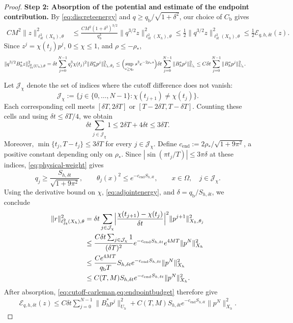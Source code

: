 \documentclass[print,wide,eng]{draft}
\begin{document}
\begin{proof}
\medskip

\textbf{Step 2: Absorption of the potential and estimate of the endpoint contribution.}
By \cref{eq:discreteenergy} and $q\ge q_{\mathrm b}/\sqrt{1+\delta^2}$, our choice of $C_{\mathrm b}$ gives
%
\begin{align*}
CM^2\|z\|_{\ell_{\delta t}^2(X_h),\theta}^2
&\le\frac{CM^2(1+\delta^2)^{3/2}}{q_{\mathrm b}^3}
\|q^{3/2}z\|_{\ell_{\delta t}^2(X_h),\theta}^2 \le\frac12\|q^{3/2}z\|_{\ell_{\delta t}^2(X_h),\theta}^2
\le\frac12\mathcal E_{q,h,\delta t}(z).
\end{align*}
%
Since $z^j=\chi(t_j)p^j$, $0\le\chi\le1$, and $\rho\le-\rho_*$,
%
\begin{align*}
\|q^{3/2}B_h^*z\|_{\ell_{\delta t}^2(U_h),\theta}^2
&=\delta t\sum_{j=0}^{N-1}q_j^3\chi(t_j)^2\|B_h^*p^j\|_{U_h,\theta_j}^2 \le\Bigl(\sup_{s\ge q_c}s^3e^{-2\rho_*s}\Bigr)
\delta t\sum_{j=0}^{N-1}\|B_h^*p^j\|_{U_h}^2 \le C\delta t\sum_{j=0}^{N-1}\|B_h^*p^j\|_{U_h}^2.
\end{align*}
%

Let $\mathcal J_\chi$ denote the set of indices where the cutoff difference does not vanish:
$$
\mathcal J_\chi:=\{j\in\{0,\ldots,N-1\}:\chi(t_{j+1})\ne\chi(t_j)\}.
$$
Each corresponding cell meets $[\delta T,2\delta T]$ or $[T-2\delta T,T-\delta T]$. Counting these cells and using $\delta t\le\delta T/4$, we obtain
$$
\delta t\sum_{j\in\mathcal J_\chi}1\le2\delta T+4\delta t\le3\delta T.
$$
Moreover, $\min\{t_j,T-t_j\}\le3\delta T$ for every $j\in\mathcal J_\chi$.
Define $c_{\mathrm{end}}:=2\rho_*/\sqrt{1+9\pi^2}$, a positive constant depending only on $\rho_*$. Since $|\sin(\pi t_j/T)|\le3\pi\delta$ at these indices, \cref{eq:physical-weight} gives
$$
q_j\ge\frac{S_{h,\delta t}}{\sqrt{1+9\pi^2}},\qquad
\theta_j(x)^2\le e^{-c_{\mathrm{end}}S_{h,\delta t}},
\qquad x\in\Omega,\quad j\in\mathcal J_\chi.
$$
Using the derivative bound on $\chi$, \cref{eq:adjointenergy}, and $\delta=q_{\mathrm b}/S_{h,\delta t}$, we conclude
\begin{align}\label{eq:endpointbudget}
\|r\|_{\ell_{\delta t}^2(X_h),\theta}^2
&=\delta t\sum_{j\in\mathcal J_\chi}
\Bigl|\frac{\chi(t_{j+1})-\chi(t_j)}{\delta t}\Bigr|^2
\|p^{j+1}\|_{X_h,\theta_j}^2\notag\\
&\le\frac{C\delta t\sum_{j\in\mathcal J_\chi}1}{(\delta T)^2}
e^{-c_{\mathrm{end}}S_{h,\delta t}}e^{4MT}\|p^N\|_{X_h}^2\notag\\
&\le\frac{Ce^{4MT}}{q_{\mathrm b}T}S_{h,\delta t}e^{-c_{\mathrm{end}}S_{h,\delta t}}\|p^N\|_{X_h}^2\notag\\
&\le C(T,M)S_{h,\delta t}e^{-c_{\mathrm{end}}S_{h,\delta t}}\|p^N\|_{X_h}^2.
\end{align}
After absorption, \cref{eq:cutoff-carleman,eq:endpointbudget} therefore give
\begin{align}\label{eq:cutoff-energy}
\mathcal E_{q,h,\delta t}(z)
\le C\delta t\sum_{j=0}^{N-1}\|B_h^*p^j\|_{U_h}^2
+C(T,M)S_{h,\delta t}e^{-c_{\mathrm{end}}S_{h,\delta t}}\|p^N\|_{X_h}^2.
\end{align}


\end{proof}
\end{document}
